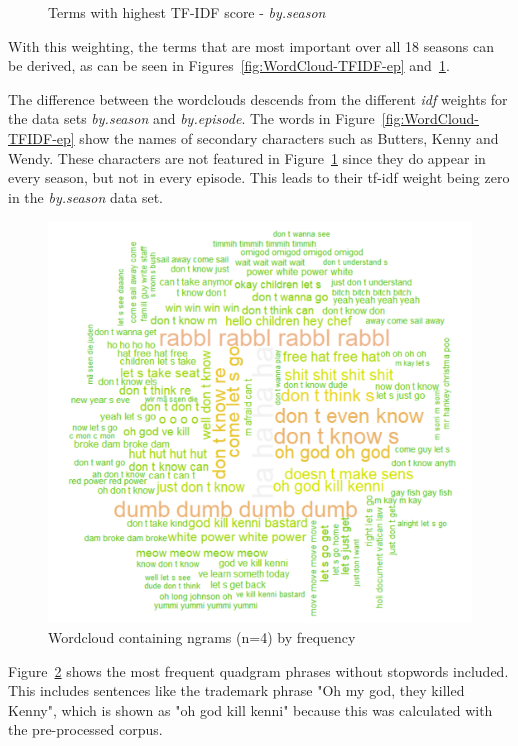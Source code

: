\documentclass[10pt,a4paper]{article}
\begin{document}
\begin{figure}[!h]
\begin{minipage}[b]{0.5\textwidth}
    \caption{Terms with highest TF-IDF score - \textit{by.season}}
	\label{fig:WordCloud-TFIDF-s}
  \end{minipage}
\end{figure}
	
	With this weighting, the terms that are most important over all 18 seasons can be derived, as can be seen in Figures~\ref{fig:WordCloud-TFIDF-ep} and~\ref{fig:WordCloud-TFIDF-s}.
	
		The difference between the wordclouds descends from the different \textit{idf} weights for the data sets \textit{by.season} and \textit{by.episode}. The words in Figure~\ref{fig:WordCloud-TFIDF-ep} show the names of secondary characters such as Butters, Kenny and Wendy. These characters are not featured in Figure~\ref{fig:WordCloud-TFIDF-s} since they do appear in every season, but not in every episode. This leads to their tf-idf weight being zero in the \textit{by.season} data set.
		
			\begin{figure}[h]
	\centering
	\includegraphics[scale=0.5]{images/WordCloud-ngram.png}
	\caption{Wordcloud containing ngrams (n=4) by frequency}
	\label{fig:WordCloud-ngram}
	\end{figure}
		
		Figure~\ref{fig:WordCloud-ngram} shows the most frequent quadgram phrases without stopwords included. This includes sentences like the trademark phrase "Oh my god, they killed Kenny", which is shown as "oh god kill kenni" because this was calculated with the pre-processed corpus.
\end{document}
